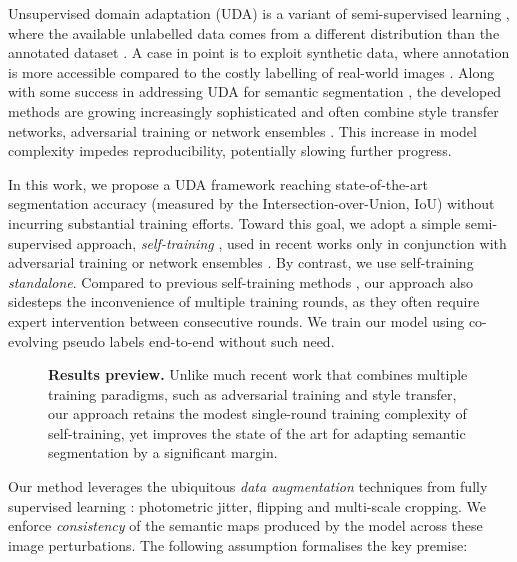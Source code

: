
Unsupervised domain adaptation (UDA) is a variant of semi-supervised learning \cite{blum1998combining}, where the available unlabelled data comes from a different distribution than the annotated dataset \cite{Ben-DavidBCP06}.
A case in point is to exploit synthetic data, where annotation is more accessible compared to the costly labelling of real-world images \cite{RichterVRK16,RosSMVL16}.
Along with some success in addressing UDA for semantic segmentation \cite{TsaiHSS0C18,VuJBCP19,0001S20,ZouYKW18}, the developed methods are growing increasingly sophisticated and often combine style transfer networks, adversarial training or network ensembles \cite{KimB20a,LiYV19,TsaiSSC19,Yang_2020_ECCV}.
This increase in model complexity impedes reproducibility, potentially slowing further progress.

In this work, we propose a UDA framework reaching state-of-the-art segmentation accuracy (measured by the Intersection-over-Union, IoU) without incurring substantial training efforts.
Toward this goal, we adopt a simple semi-supervised approach, \emph{self-training} \cite{ChenWB11,lee2013pseudo,ZouYKW18}, used in recent works only in conjunction with adversarial training or network ensembles \cite{ChoiKK19,KimB20a,Mei_2020_ECCV,Wang_2020_ECCV,0001S20,Zheng_2020_IJCV,ZhengY20}.
By contrast, we use self-training \emph{standalone}.
Compared to previous self-training methods \cite{ChenLCCCZAS20,Li_2020_ECCV,subhani2020learning,ZouYKW18,ZouYLKW19}, our approach also sidesteps the inconvenience of multiple training rounds, as they often require expert intervention between consecutive rounds.
We train our model using co-evolving pseudo labels end-to-end without such need.

\begin{figure}[t]%
    \centering
    \def\svgwidth{\linewidth}
    
    \caption{\textbf{Results preview.} Unlike much recent work that combines multiple training paradigms, such as adversarial training and style transfer, our approach retains the modest single-round training complexity of self-training, yet improves the state of the art for adapting semantic segmentation by a significant margin.}
    \label{fig:preview}
\end{figure}

Our method leverages the ubiquitous \emph{data augmentation} techniques from fully supervised learning \cite{deeplabv3plus2018,ZhaoSQWJ17}: photometric jitter, flipping and multi-scale cropping.
We enforce \emph{consistency} of the semantic maps produced by the model across these image perturbations.
The following assumption formalises the key premise:

